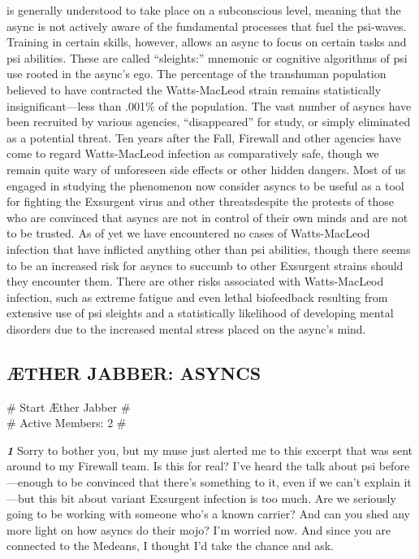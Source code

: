 is generally understood to take place on
a subconscious level, meaning that the
async is not actively aware of the fundamental
processes that fuel the psi-waves.
Training in certain skills, however, allows
an async to focus on certain tasks and
psi abilities. These are called “sleights:”
mnemonic or cognitive algorithms of psi
use rooted in the async’s ego.
The percentage of the transhuman
population believed to have contracted
the Watts-MacLeod strain remains statistically
insignificant—less than .001\%
of the population. The vast number of
asyncs have been recruited by various
agencies, “disappeared” for study, or
simply eliminated as a potential threat.
Ten years after the Fall, Firewall and
other agencies have come to regard
Watts-MacLeod infection as comparatively
safe, though we remain quite
wary of unforeseen side effects or other
hidden dangers. Most of us engaged in
studying the phenomenon now consider
asyncs to be useful as a tool for fighting
the Exsurgent virus and other threatsdespite the protests of those who are
convinced that asyncs are not in control
of their own minds and are not to be
trusted. As of yet we have encountered
no cases of Watts-MacLeod infection
that have inflicted anything other than
psi abilities, though there seems to be
an increased risk for asyncs to succumb
to other Exsurgent strains should they
encounter them. There are other risks associated
with Watts-MacLeod infection,
such as extreme fatigue and even lethal
biofeedback resulting from extensive use
of psi sleights and a statistically likelihood
of developing mental disorders due
to the increased mental stress placed on
the async’s mind.

\newpage
\subsection{ÆTHER JABBER: ASYNCS}
\# Start Æther Jabber \# \\
\# Active Members: 2 \#

\textbf{\textit{1}} Sorry to bother you, but my muse just
alerted me to this excerpt that was
sent around to my Firewall team. Is
this for real? I’ve heard the talk about
psi before—enough to be convinced
that there’s something to it, even
if we can’t explain it—but this bit
about variant Exsurgent infection is
too much. Are we seriously going to
be working with someone who’s a
known carrier? And can you shed any
more light on how asyncs do their
mojo? I’m worried now. And since
you are connected to the Medeans, I
thought I’d take the chance and ask.

